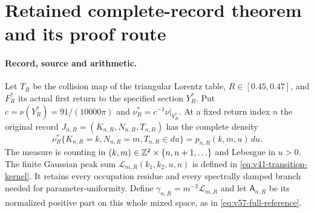 \section{Retained complete-record theorem and its proof route}
\label{app:v58-retained-front}


\paragraph{Record, source and arithmetic.}
Let $T_R$ be the collision map of the triangular Lorentz table,
$R\in[0.45,0.47]$, and $F_R^*$ its actual first return to the specified
section $Y_R^*$. Put $c=\nu(Y_R^*)=91/(10000\pi)$ and
$\nu_R^*=c^{-1}\nu|_{Y_R^*}$. At a fixed return index $n$ the original
record $J_{n,R}=(K_{n,R},N_{n,R},T_{n,R})$ has the complete density
\[
 \nu_R^*\{K_{n,R}=k,N_{n,R}=m,T_{n,R}\in du\}
                       =p_{n,R}(k,m,u)\,du.
\]
The measure is counting in $(k,m)\in\mathbb Z^2\times\{n,n+1,\ldots\}$
and Lebesgue in $u>0$. The finite Gaussian peak sum
$\mathcal L_{m,R}(k_1,k_2,u,n)$ is defined in
\eqref{eq:v41-transition-kernel}. It retains every occupation residue
and every spectrally damped branch needed for parameter-uniformity.
Define $\gamma_{n,R}=m^{-2}\mathcal L_{m,R}$ and let
$\mathsf A_{n,R}$ be its normalized positive part on this whole mixed
space, as in \eqref{eq:v57-full-reference}.

